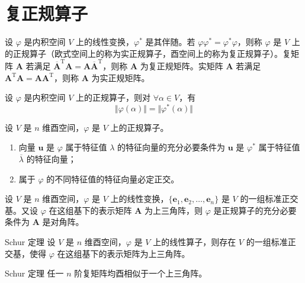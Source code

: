 
\section{复正规算子}

\begin{definition}
设 $\varphi$ 是内积空间 $V$ 上的线性变换，$\varphi^*$ 是其伴随。若 $\varphi\varphi^* = \varphi^*\varphi$，则称 $\varphi$ 是 $V$ 上的正规算子（欧式空间上的称为实正规算子，酉空间上的称为复正规算子）。复矩阵 $\bm{A}$ 若满足 $\overline{\bm{A}}^{\mathrm{T}}\bm{A} = \bm{A}\overline{\bm{A}}^{\mathrm{T}}$，则称 $\bm{A}$ 为复正规矩阵。实矩阵 $\bm{A}$ 若满足 $\bm{A}^{\mathrm{T}}\bm{A} = \bm{AA}^{\mathrm{T}}$，则称 $\bm{A}$ 为实正规矩阵。
\end{definition}

\begin{lemma}
    设 $\varphi$ 是内积空间 $V$ 上的正规算子，则对 $\forall \alpha \in V$，有
    \[
        \Vert \varphi(\alpha) \Vert = \Vert \varphi^*(\alpha) \Vert
    \]
\end{lemma}

\begin{proposition}
    设 $V$ 是 $n$ 维酉空间，$\varphi $ 是 $V$ 上的正规算子。
    \begin{enumerate}
        \item 向量 $\bm{u}$ 是 $\varphi$ 属于特征值 $\lambda$ 的特征向量的充分必要条件为 $\bm{u}$ 是 $\varphi^*$ 属于特征值 $\overline{\lambda}$ 的特征向量；
        \item 属于 $\varphi$ 的不同特征值的特征向量必定正交。
    \end{enumerate}
\end{proposition}

\begin{lemma}
    设 $V$ 是 $n$ 维酉空间，$\varphi $ 是 $V$ 上的线性变换，$\{\bm{e}_{1}, \bm{e}_{2}, \ldots, \bm{e}_{n}\}$ 是 $V$ 的一组标准正交基。又设 $\varphi$ 在这组基下的表示矩阵 $\bm{A}$ 为上三角阵，则 $\varphi$ 是正规算子的充分必要条件为 $\bm{A}$ 是对角阵。
\end{lemma}

\begin{theorem}{Schur 定理}
  设 $V$ 是 $n$ 维酉空间，$\varphi $ 是 $V$ 上的线性算子，则存在 $V$ 的一组标准正交基，使得 $\varphi$ 在这组基下的表示矩阵为上三角阵。
\end{theorem}

\begin{corollary}{Schur 定理}
  任一 $n$ 阶复矩阵均酉相似于一个上三角阵。
\end{corollary}

